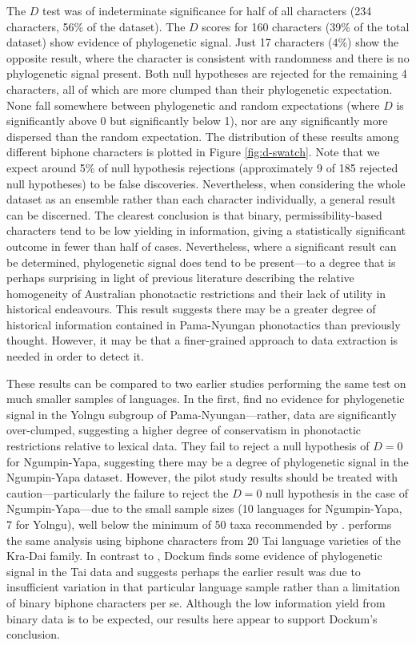 The \(D\) test was of indeterminate significance for half of all characters (234 characters, 56\% of the dataset). The \(D\) scores for 160 characters (39\% of the total dataset) show evidence of phylogenetic signal. Just 17 characters (4\%) show the opposite result, where the character is consistent with randomness and there is no phylogenetic signal present. Both null hypotheses are rejected for the remaining 4 characters, all of which are more clumped than their phylogenetic expectation. None fall somewhere between phylogenetic and random expectations (where \(D\) is significantly above 0 but significantly below 1), nor are any significantly more dispersed than the random expectation. The distribution of these results among different biphone characters is plotted in Figure \ref{fig:d-swatch}. Note that we expect around 5\% of null hypothesis rejections (approximately 9 of 185 rejected null hypotheses) to be false discoveries. Nevertheless, when considering the whole dataset as an ensemble rather than each character individually, a general result can be discerned. The clearest conclusion is that binary, permissibility-based characters tend to be low yielding in information, giving a statistically significant outcome in fewer than half of cases. Nevertheless, where a significant result can be determined, phylogenetic signal does tend to be present---to a degree that is perhaps surprising in light of previous literature describing the relative homogeneity of Australian phonotactic restrictions and their lack of utility in historical endeavours. This result suggests there may be a greater degree of historical information contained in Pama-Nyungan phonotactics than previously thought. However, it may be that a finer-grained approach to data extraction is needed in order to detect it.

These results can be compared to two earlier studies performing the same test on much smaller samples of languages. In the first, \textcite{macklin-cordes_high-definition_2015} find no evidence for phylogenetic signal in the Yolngu subgroup of Pama-Nyungan---rather, data are significantly over-clumped, suggesting a higher degree of conservatism in phonotactic restrictions relative to lexical data. They fail to reject a null hypothesis of \(D = 0\) for Ngumpin-Yapa, suggesting there may be a degree of phylogenetic signal in the Ngumpin-Yapa dataset. However, the pilot study results should be treated with caution---particularly the failure to reject the \(D = 0\) null hypothesis in the case of Ngumpin-Yapa---due to the small sample sizes (10 languages for Ngumpin-Yapa, 7 for Yolngu), well below the minimum of 50 taxa recommended by \textcite{fritz_selectivity_2010}. \textcite{dockum_phylogeny_2018} performs the same analysis using biphone characters from 20 Tai language varieties of the Kra-Dai family. In contrast to \textcite{macklin-cordes_high-definition_2015}, Dockum finds some evidence of phylogenetic signal in the Tai data and suggests perhaps the earlier result was due to insufficient variation in that particular language sample rather than a limitation of binary biphone characters per se. Although the low information yield from binary data is to be expected, our results here appear to support Dockum's conclusion.

